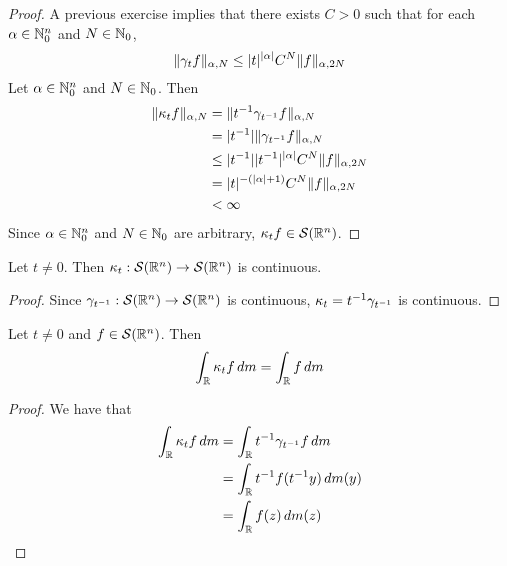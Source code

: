 \documentclass{book}
\begin{document}
	\begin{proof}
		A previous exercise implies that there exists $C > 0$ such that for each $\alpha \in \mathbb{N}_0^n$ and $N \in \mathbb{N}_0$, 
		$$\| \gamma_t f\|_{\alpha, N} \leq |t|^{|\alpha|} C^N\|f\|_{\alpha, 2N}$$
		Let $\alpha \in \mathbb{N}_0^n$ and $N \in \mathbb{N}_0$. Then
		\begin{align*}
			\|\kappa_t f\|_{\alpha, N}
			& = \|t^{-1} \gamma_{t^{-1}} f \|_{\alpha, N} \\
			& = |t^{-1}| \|\gamma_{t^{-1}} f \|_{\alpha, N} \\
			& \leq |t^{-1}| |t^{-1}|^{|\alpha|} C^N\|f\|_{\alpha, 2N} \\
			& = |t|^{-(|\alpha| + 1)} C^N \|f\|_{\alpha, 2N} \\
			& < \infty 
		\end{align*}
		Since $\alpha \in \mathbb{N}_0^n$ and $N \in \mathbb{N}_0$ are arbitrary, $\kappa_t f \in \mathcal{S}(\mathbb{R}^n)$.
	\end{proof}
	
	\begin{ex}
		Let $t \neq 0$. Then $\kappa_t: \mathcal{S}(\mathbb{R}^n) \rightarrow \mathcal{S}(\mathbb{R}^n)$ is continuous.
	\end{ex}
	
	\begin{proof} 
	Since $\gamma_{t^{-1}}: \mathcal{S}(\mathbb{R}^n) \rightarrow \mathcal{S}(\mathbb{R}^n)$ is continuous, $\kappa_t = t^{-1} \gamma_{t^{-1}}$ is continuous.
	\end{proof}


		\begin{ex}
		Let $t \neq 0$ and $f \in \mathcal{S}(\mathbb{R}^n)$. Then 
		$$\int_{\mathbb{R}} \kappa_t f \, d m  = \int_{\mathbb{R}} f \, d m$$
	\end{ex}
	
	\begin{proof}
		We have that 
		\begin{align*}
			\int_{\mathbb{R}} \kappa_t f \, d m
			& = \int_{\mathbb{R}} t^{-1} \gamma_{t^{-1}} f \, d m \\
			& = \int_{\mathbb{R}} t^{-1} f(t^{-1} y) \, d m(y) \\
			& = \int_{\mathbb{R}}  f(z) \, d m(z) \\
		\end{align*}
	\end{proof}
\end{document}
